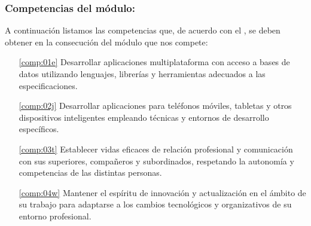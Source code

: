 \subsubsection{Competencias del módulo:}

A continuación listamos las competencias que, de acuerdo con el , se deben obtener en la consecución del módulo que nos compete:

\begin{itemize}
\item[\ref{comp:01e}] Desarrollar aplicaciones multiplataforma con acceso a bases de datos utilizando lenguajes, librerías y herramientas adecuados a las especificaciones.
\item[\ref{comp:02j}] Desarrollar aplicaciones para teléfonos móviles, tabletas y otros dispositivos inteligentes empleando técnicas y entornos de desarrollo específicos.
\item[\ref{comp:03t}] Establecer vidas eficaces de relación profesional y comunicación con sus superiores, compañeros y subordinados, respetando la autonomía y competencias de las distintas personas.
\item[\ref{comp:04w}] Mantener el espíritu de innovación y actualización en el ámbito de su trabajo para adaptarse a los cambios tecnológicos y organizativos de su entorno profesional.
\end{itemize}
